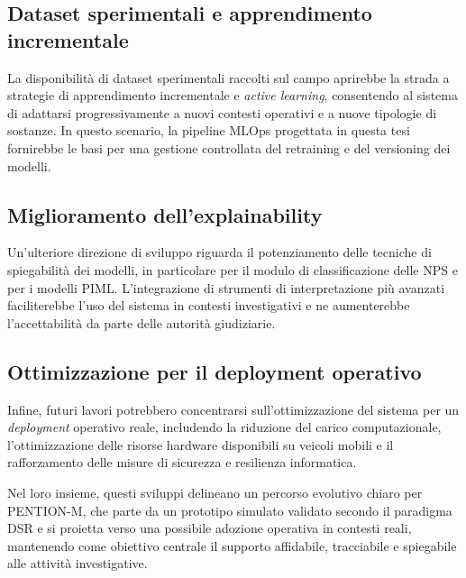 \subsection{Dataset sperimentali e apprendimento incrementale}

La disponibilità di dataset sperimentali raccolti sul campo aprirebbe la strada a strategie di apprendimento incrementale e \textit{active learning}, consentendo al sistema di adattarsi progressivamente a nuovi contesti operativi e a nuove tipologie di sostanze.
In questo scenario, la pipeline MLOps progettata in questa tesi fornirebbe le basi per una gestione controllata del retraining e del versioning dei modelli.

\subsection{Miglioramento dell’explainability}

Un’ulteriore direzione di sviluppo riguarda il potenziamento delle tecniche di spiegabilità dei modelli, in particolare per il modulo di classificazione delle NPS e per i modelli PIML.
L’integrazione di strumenti di interpretazione più avanzati faciliterebbe l’uso del sistema in contesti investigativi e ne aumenterebbe l’accettabilità da parte delle autorità giudiziarie.

\subsection{Ottimizzazione per il deployment operativo}

Infine, futuri lavori potrebbero concentrarsi sull’ottimizzazione del sistema per un \textit{deployment} operativo reale, includendo la riduzione del carico computazionale, l’ottimizzazione delle risorse hardware disponibili su veicoli mobili e il rafforzamento delle misure di sicurezza e resilienza informatica.

Nel loro insieme, questi sviluppi delineano un percorso evolutivo chiaro per \textsc{PENTION-M}, che parte da un prototipo simulato validato secondo il paradigma DSR e si proietta verso una possibile adozione operativa in contesti reali, mantenendo come obiettivo centrale il supporto affidabile, tracciabile e spiegabile alle attività investigative.